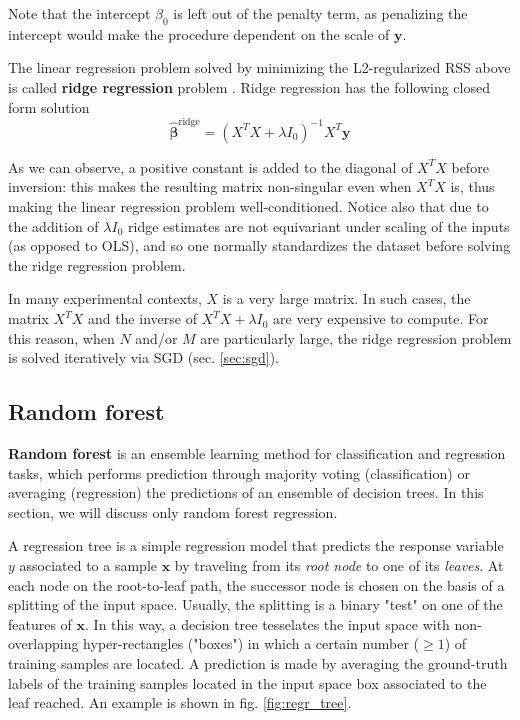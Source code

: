Note that the intercept $\beta_0$ is left out of the penalty term, as penalizing the intercept would make the procedure dependent on the scale of $\mathbf{y}$.

The linear regression problem solved by minimizing the L2-regularized RSS above is called \textbf{ridge regression} problem \cite{ridge, hastie}.
Ridge regression has the following closed form solution
\[
\hat{\bm{\beta}}^\text{ridge} = (X^TX+\lambda I_0)^{-1}X^T\mathbf{y}
\]

As we can observe, a positive constant is added to the diagonal of $X^TX$ before inversion: this makes the resulting matrix non-singular even when $X^TX$ is, thus making the linear regression problem well-conditioned. Notice also that due to the addition of $\lambda I_0$ ridge estimates are not equivariant under scaling of the inputs (as opposed to OLS), and so one normally standardizes the dataset before solving the ridge regression problem.

In many experimental contexts, $X$ is a very large matrix. In such cases, the matrix $X^TX$ and the inverse of $X^TX+\lambda I_0$ are very expensive to compute. For this reason, when $N$ and/or $M$ are particularly large, the ridge regression problem is solved iteratively via SGD (sec. \ref{sec:sgd}).





\subsection{Random forest}
\label{sec:random_forest}
\textbf{Random forest} \cite{random_forest, hastie} is an ensemble learning method for classification and regression tasks, which performs prediction through majority voting (classification) or averaging (regression) the predictions of an ensemble of decision trees. In this section, we will discuss only random forest regression.

A regression tree is a simple regression model that predicts the response variable $y$ associated to a sample $\mathbf{x}$ by traveling from its \textit{root node} to one of its \textit{leaves}. At each node on the root-to-leaf path, the successor node is chosen on the basis of a splitting of the input space. Usually, the splitting is a binary "test" on one of the features of $\mathbf{x}$. In this way, a decision tree tesselates the input space with non-overlapping hyper-rectangles ("boxes") in which a certain number ($\geq1$) of training samples are located. A prediction is made by averaging the ground-truth labels of the training samples located in the input space box associated to the leaf reached. An example is shown in fig. \ref{fig:regr_tree}.


